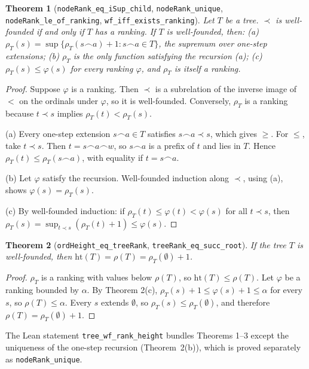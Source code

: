 \documentclass[11pt]{article}
\newtheorem{theorem}{Theorem}
\theoremstyle{definition}
\newcommand{\Ext}{\mathrel{\prec}}
\begin{document}
\begin{theorem}[\texttt{nodeRank\_eq\_iSup\_child}, \texttt{nodeRank\_unique}, \texttt{nodeRank\_le\_of\_ranking}, \texttt{wf\_iff\_exists\_ranking}]
Let $T$ be a tree. $\Ext$ is well-founded if and only if $T$ has a ranking. If $T$ is well-founded,
then:
(a) $\rho_T(s)=\sup\{\rho_T(s\frown a)+1: s\frown a\in T\}$, the supremum over one-step extensions;
(b) $\rho_T$ is the only function satisfying the recursion (a);
(c) $\rho_T(s)\le\varphi(s)$ for every ranking $\varphi$, and $\rho_T$ is itself a ranking.
\end{theorem}
\begin{proof}
Suppose $\varphi$ is a ranking. Then $\Ext$ is a subrelation of the inverse image of $<$ on the
ordinals under $\varphi$, so it is well-founded. Conversely, $\rho_T$ is a ranking because
$t\Ext s$ implies $\rho_T(t)<\rho_T(s)$.

(a) Every one-step extension $s\frown a\in T$ satisfies $s\frown a\Ext s$, which gives $\ge$. For
$\le$, take $t\Ext s$. Then $t=s\frown a\frown w$, so $s\frown a$ is a prefix of $t$ and lies in $T$.
Hence $\rho_T(t)\le\rho_T(s\frown a)$, with equality if $t=s\frown a$.

(b) Let $\varphi$ satisfy the recursion. Well-founded induction along $\Ext$, using (a), shows
$\varphi(s)=\rho_T(s)$.

(c) By well-founded induction: if $\rho_T(t)\le\varphi(t)<\varphi(s)$ for all $t\Ext s$, then
$\rho_T(s)=\sup_{t\Ext s}(\rho_T(t)+1)\le\varphi(s)$.
\end{proof}

\begin{theorem}[\texttt{ordHeight\_eq\_treeRank}, \texttt{treeRank\_eq\_succ\_root}]
If the tree $T$ is well-founded, then $\mathrm{ht}(T)=\rho(T)=\rho_T(\emptyset)+1$.
\end{theorem}
\begin{proof}
$\rho_T$ is a ranking with values below $\rho(T)$, so $\mathrm{ht}(T)\le\rho(T)$. Let $\varphi$ be a
ranking bounded by $\alpha$. By Theorem 2(c), $\rho_T(s)+1\le\varphi(s)+1\le\alpha$ for every $s$, so
$\rho(T)\le\alpha$. Every $s$ extends $\emptyset$, so $\rho_T(s)\le\rho_T(\emptyset)$, and therefore
$\rho(T)=\rho_T(\emptyset)+1$.
\end{proof}
The Lean statement \texttt{tree\_wf\_rank\_height} bundles Theorems 1--3 except the uniqueness of the one-step recursion (Theorem~2(b)), which is proved separately as \texttt{nodeRank\_unique}.
\end{document}
